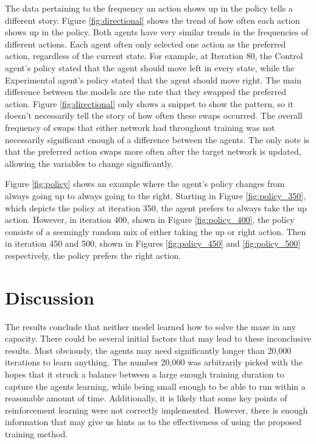 \documentclass[12pt]{article}
\begin{document}
The data pertaining to the frequency an action shows up in the policy tells a different story.
Figure \ref{fig:directional} shows the trend of how often each action shows up in the policy.
Both agents have very similar trends in the frequencies of different actions.
Each agent often only selected one action as the preferred action, regardless of the current state.
For example, at Iteration 80, the Control agent's policy stated that the agent should move left in every state, while the Experimental agent's policy stated that the agent should move right.
The main difference between the models are the rate that they swapped the preferred action.
Figure \ref{fig:directional} only shows a snippet to show the pattern, so it doesn't necessarily tell the story of how often these swaps occurred.
The overall frequency of swaps that either network had throughout training was not necessarily significant enough of a difference between the agents.
The only note is that the preferred action swaps more often after the target network is updated, allowing the variables to change significantly.

Figure \ref{fig:policy} shows an example where the agent's policy changes from always going up to always going to the right.
Starting in Figure \ref{fig:policy_350}, which depicts the policy at iteration 350, the agent prefers to always take the up action.
However, in iteration 400, shown in Figure \ref{fig:policy_400}, the policy consists of a seemingly random mix of either taking the up or right action.
Then in iteration 450 and 500, shown in Figures \ref{fig:policy_450} and \ref{fig:policy_500} respectively, the policy prefers the right action.

\section{Discussion}

The results conclude that neither model learned how to solve the maze in any capacity.
There could be several initial factors that may lead to these inconclusive results.
Most obviously, the agents may need significantly longer than 20,000 iterations to learn anything.
The number 20,000 was arbitrarily picked with the hopes that it struck a balance between a large enough training duration to capture the agents learning, while being small enough to be able to run within a reasonable amount of time.
Additionally, it is likely that some key points of reinforcement learning were not correctly implemented.
However, there is enough information that may give us hints as to the effectiveness of using the proposed training method.
\end{document}
